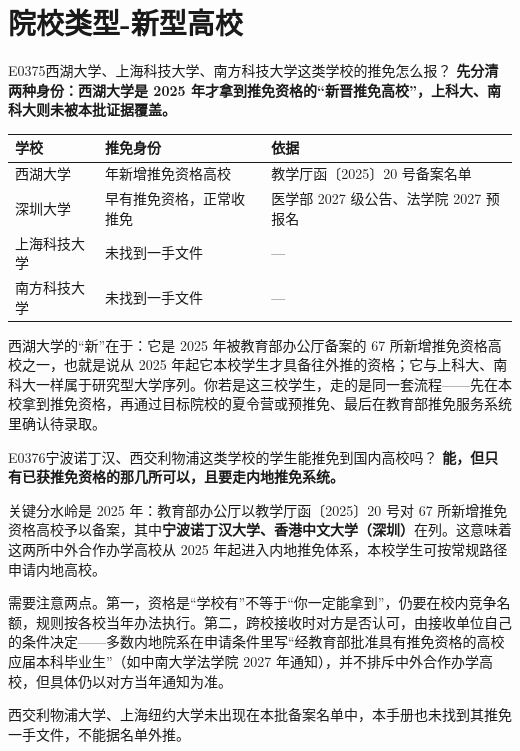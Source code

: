 \section{院校类型-新型高校}
\begin{qa}{E0375}{西湖大学、上海科技大学、南方科技大学这类学校的推免怎么报？}
\textbf{先分清两种身份：西湖大学是 2025 年才拿到推免资格的“新晋推免高校”，上科大、南科大则未被本批证据覆盖。}

\par\vspace{2pt}\nobreak\begin{center}\footnotesize
\begin{tabularx}{\textwidth}{>{\raggedright\arraybackslash}X>{\raggedright\arraybackslash}X>{\raggedright\arraybackslash}X}
\toprule
\textbf{学校} & \textbf{推免身份} & \textbf{依据} \\ \midrule
西湖大学 & 2025 年新增推免资格高校 & 教学厅函〔2025〕20 号备案名单 \\
深圳大学 & 早有推免资格，正常收推免 & 医学部 2027 级公告、法学院 2027 预报名 \\
上海科技大学 & 未找到一手文件 & — \\
南方科技大学 & 未找到一手文件 & — \\
\bottomrule
\end{tabularx}
\end{center}\vspace{2pt}\par

西湖大学的“新”在于：它是 2025 年被教育部办公厅备案的 67 所新增推免资格高校之一，也就是说从 2025 年起它本校学生才具备往外推的资格；它与上科大、南科大一样属于研究型大学序列。你若是这三校学生，走的是同一套流程——先在本校拿到推免资格，再通过目标院校的夏令营或预推免、最后在教育部推免服务系统里确认待录取。
\end{qa}

\begin{qa}{E0376}{宁波诺丁汉、西交利物浦这类学校的学生能推免到国内高校吗？}
\textbf{能，但只有已获推免资格的那几所可以，且要走内地推免系统。}

关键分水岭是 2025 年：教育部办公厅以教学厅函〔2025〕20 号对 67 所新增推免资格高校予以备案，其中\textbf{宁波诺丁汉大学、香港中文大学（深圳）}在列。这意味着这两所中外合作办学高校从 2025 年起进入内地推免体系，本校学生可按常规路径申请内地高校。

需要注意两点。第一，资格是“学校有”不等于“你一定能拿到”，仍要在校内竞争名额，规则按各校当年办法执行。第二，跨校接收时对方是否认可，由接收单位自己的条件决定——多数内地院系在申请条件里写“经教育部批准具有推免资格的高校应届本科毕业生”（如中南大学法学院 2027 年通知），并不排斥中外合作办学高校，但具体仍以对方当年通知为准。

西交利物浦大学、上海纽约大学未出现在本批备案名单中，本手册也未找到其推免一手文件，不能据名单外推。
\end{qa}

